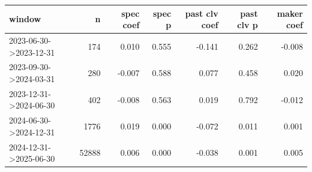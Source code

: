 \begin{tabular}{lrrrrrr}
\toprule
window & n & spec coef & spec p & past clv coef & past clv p & maker coef \\
\midrule
2023-06-30->2023-12-31 & 174 & 0.010 & 0.555 & -0.141 & 0.262 & -0.008 \\
2023-09-30->2024-03-31 & 280 & -0.007 & 0.588 & 0.077 & 0.458 & 0.020 \\
2023-12-31->2024-06-30 & 402 & -0.008 & 0.563 & 0.019 & 0.792 & -0.012 \\
2024-06-30->2024-12-31 & 1776 & 0.019 & 0.000 & -0.072 & 0.011 & 0.001 \\
2024-12-31->2025-06-30 & 52888 & 0.006 & 0.000 & -0.038 & 0.001 & 0.005 \\
\bottomrule
\end{tabular}
